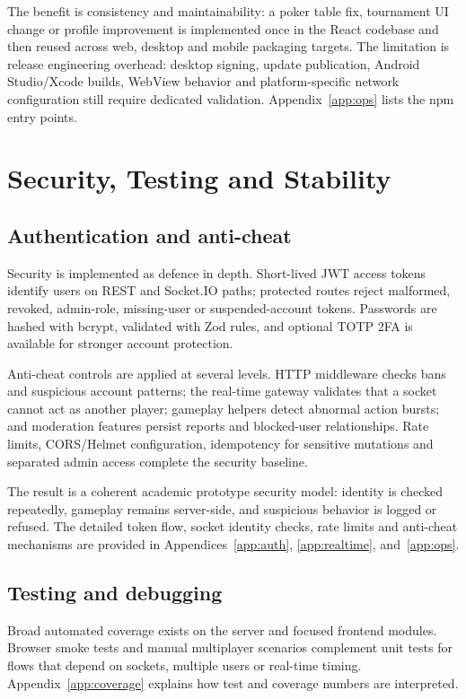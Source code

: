 \documentclass[11pt,a4paper]{article}
\begin{document}
The benefit is consistency and maintainability: a poker table fix, tournament UI change or profile improvement is implemented once in the React codebase and then reused across web, desktop and mobile packaging targets. The limitation is release engineering overhead: desktop signing, update publication, Android Studio/Xcode builds, WebView behavior and platform-specific network configuration still require dedicated validation. Appendix~\ref{app:ops} lists the npm entry points.

\section{Security, Testing and Stability}
\label{sec:security}

\subsection{Authentication and anti-cheat}

Security is implemented as defence in depth. Short-lived JWT access tokens identify users on REST and Socket.IO paths; protected routes reject malformed, revoked, admin-role, missing-user or suspended-account tokens. Passwords are hashed with bcrypt, validated with Zod rules, and optional TOTP 2FA is available for stronger account protection.

Anti-cheat controls are applied at several levels. HTTP middleware checks bans and suspicious account patterns; the real-time gateway validates that a socket cannot act as another player; gameplay helpers detect abnormal action bursts; and moderation features persist reports and blocked-user relationships. Rate limits, CORS/Helmet configuration, idempotency for sensitive mutations and separated admin access complete the security baseline.

The result is a coherent academic prototype security model: identity is checked repeatedly, gameplay remains server-side, and suspicious behavior is logged or refused. The detailed token flow, socket identity checks, rate limits and anti-cheat mechanisms are provided in Appendices~\ref{app:auth}, \ref{app:realtime}, and~\ref{app:ops}.

\subsection{Testing and debugging}

Broad automated coverage exists on the server and focused frontend modules. Browser smoke tests and manual multiplayer scenarios complement unit tests for flows that depend on sockets, multiple users or real-time timing. Appendix~\ref{app:coverage} explains how test and coverage numbers are interpreted.
\end{document}
